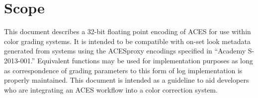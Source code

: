 \cleardoublepage
\numberedformat	
\chapter{Scope} 	%

This document describes a 32-bit floating point encoding of ACES for use within color grading systems. It is intended to be compatible with on-set look metadata generated from systems using the ACESproxy encodings specified in ``Academy S-2013-001.'' Equivalent functions may be used for implementation purposes as long as correspondence of grading parameters to this form of log implementation is properly maintained. This document is intended as a guideline to aid developers who are integrating an ACES workflow into a color correction system.
